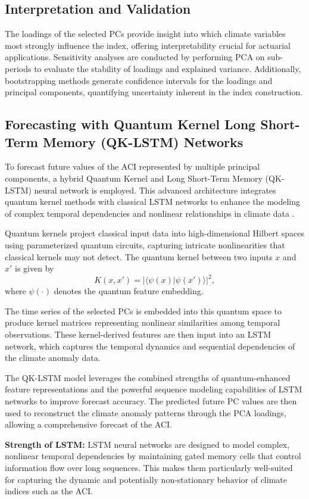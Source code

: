 \documentclass[12pt,a4paper]{report}
\begin{document}
\subsection{Interpretation and Validation}
The loadings of the selected PCs provide insight into which climate variables most strongly influence the index, offering interpretability crucial for actuarial applications. Sensitivity analyses are conducted by performing PCA on sub-periods to evaluate the stability of loadings and explained variance. 
Additionally, bootstrapping methods generate confidence intervals for the loadings and principal components, quantifying uncertainty inherent in the index construction.

\subsection{Forecasting with Quantum Kernel Long Short-Term Memory (QK-LSTM) Networks}
To forecast future values of the ACI represented by multiple principal components, a hybrid Quantum Kernel and Long Short-Term Memory (QK-LSTM) neural network is employed. 
This advanced architecture integrates quantum kernel methods with classical LSTM networks to enhance the modeling of complex temporal dependencies and nonlinear relationships in climate data \citep{schuld2019quantum, li2022quantum}.

Quantum kernels project classical input data into high-dimensional Hilbert spaces using parameterized quantum circuits, capturing intricate nonlinearities that classical kernels may not detect. The quantum kernel between two inputs \(x\) and \(x'\) is given by
\[
K(x, x') = |\langle \psi(x) | \psi(x') \rangle|^2,
\]
where \(\psi(\cdot)\) denotes the quantum feature embedding.

The time series of the selected PCs is embedded into this quantum space to produce kernel matrices representing nonlinear similarities among temporal observations. These kernel-derived features are then input into an LSTM network, which captures the temporal dynamics and sequential dependencies of the climate anomaly data.

The QK-LSTM model leverages the combined strengths of quantum-enhanced feature representations and the powerful sequence modeling capabilities of LSTM networks to improve forecast accuracy. The predicted future PC values are then used to reconstruct the climate anomaly patterns through the PCA loadings, allowing a comprehensive forecast of the ACI.

\textbf{Strength of LSTM:}  
LSTM neural networks are designed to model complex, nonlinear temporal dependencies by maintaining gated memory cells that control information flow over long sequences. This makes them particularly well-suited for capturing the dynamic and potentially non-stationary behavior of climate indices such as the ACI.
\end{document}
